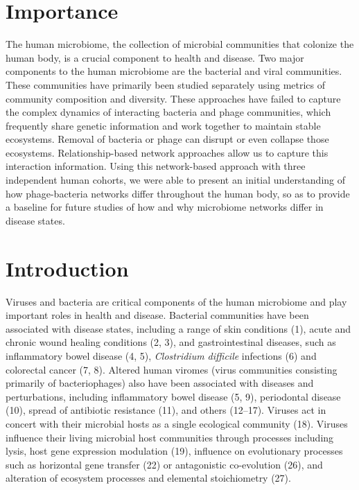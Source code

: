 \documentclass[12pt,]{article}
\begin{document}
\newpage

\section{Importance}\label{importance}

The human microbiome, the collection of microbial communities that
colonize the human body, is a crucial component to health and disease.
Two major components to the human microbiome are the bacterial and viral
communities. These communities have primarily been studied separately
using metrics of community composition and diversity. These approaches
have failed to capture the complex dynamics of interacting bacteria and
phage communities, which frequently share genetic information and work
together to maintain stable ecosystems. Removal of bacteria or phage can
disrupt or even collapse those ecosystems. Relationship-based network
approaches allow us to capture this interaction information. Using this
network-based approach with three independent human cohorts, we were
able to present an initial understanding of how phage-bacteria networks
differ throughout the human body, so as to provide a baseline for future
studies of how and why microbiome networks differ in disease states.

\newpage

\section{Introduction}\label{introduction}

Viruses and bacteria are critical components of the human microbiome and
play important roles in health and disease. Bacterial communities have
been associated with disease states, including a range of skin
conditions (1), acute and chronic wound healing conditions (2, 3), and
gastrointestinal diseases, such as inflammatory bowel disease (4, 5),
\emph{Clostridium difficile} infections (6) and colorectal cancer (7,
8). Altered human viromes (virus communities consisting primarily of
bacteriophages) also have been associated with diseases and
perturbations, including inflammatory bowel disease (5, 9), periodontal
disease (10), spread of antibiotic resistance (11), and others (12--17).
Viruses act in concert with their microbial hosts as a single ecological
community (18). Viruses influence their living microbial host
communities through processes including lysis, host gene expression
modulation (19), influence on evolutionary processes such as horizontal
gene transfer (22) or antagonistic co-evolution (26), and alteration of
ecosystem processes and elemental stoichiometry (27).
\end{document}
